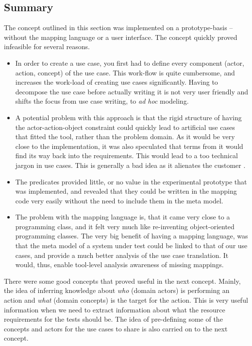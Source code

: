 \subsection{Summary}
The concept outlined in this section was implemented on a prototype-basis -- without the mapping language or a user interface. The concept quickly proved infeasible for several reasons.
\begin{itemize}
  \item In order to create a use case, you first had to define every component (actor, action, concept) of the use case. This work-flow is quite cumbersome, and increases the work-load of creating use cases significantly. Having to decompose the use case before actually writing it is not very user friendly and shifts the focus from use case writing, to \emph{ad hoc} modeling.
  
  \item A potential problem with this approach is that the rigid structure of having the actor-action-object constraint could quickly lead to artificial use cases that fitted the tool, rather than the problem domain. As it would be very close to the implementation, it was also speculated that terms from it would find its way back into the requirements. This would lead to a too technical jargon in use cases. This is generally a bad idea as it alienates the customer \cite{christel1992}.

  \item The predicates provided little, or no value in the experimental prototype that was implemented, and revealed that they could be written in the mapping code very easily without the need to include them in the meta model.

  \item The problem with the mapping language is, that it came very close to a programming class, and it felt very much like re-inventing object-oriented programming classes. The very big benefit of having a mapping language, was that the meta model of a system under test could be linked to that of our use cases, and provide a much better analysis of the use case translation. It would, thus, enable tool-level analysis awareness of missing mappings.

\end{itemize}
There were some good concepts that proved useful in the next concept. Mainly, the idea of inferring knowledge about \emph{who} (domain actors) is performing an action and \emph{what} (domain concepts) is the target for the action. This is very useful information when we need to extract information about what the resource requirements for the tests should be. The idea of pre-defining some of the concepts and actors for the use cases to share is also carried on to the next concept.

